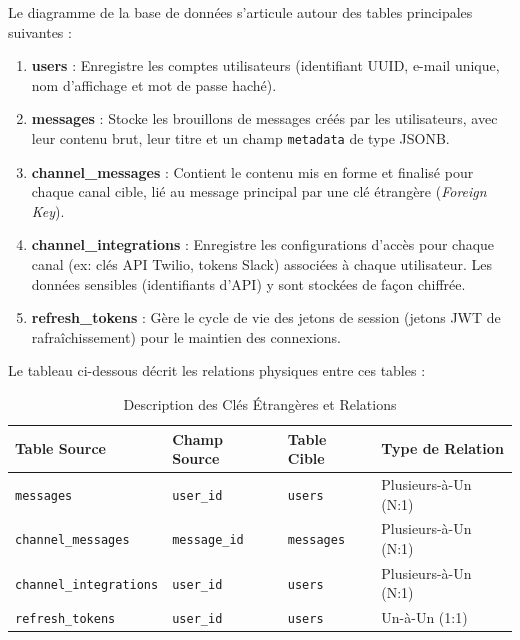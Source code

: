 Le diagramme de la base de données s'articule autour des tables principales suivantes :
\begin{enumerate}
    \item \textbf{users} : Enregistre les comptes utilisateurs (identifiant UUID, e-mail unique, nom d'affichage et mot de passe haché).
    \item \textbf{messages} : Stocke les brouillons de messages créés par les utilisateurs, avec leur contenu brut, leur titre et un champ \texttt{metadata} de type JSONB.
    \item \textbf{channel\_messages} : Contient le contenu mis en forme et finalisé pour chaque canal cible, lié au message principal par une clé étrangère (\textit{Foreign Key}).
    \item \textbf{channel\_integrations} : Enregistre les configurations d'accès pour chaque canal (ex: clés API Twilio, tokens Slack) associées à chaque utilisateur. Les données sensibles (identifiants d'API) y sont stockées de façon chiffrée.
    \item \textbf{refresh\_tokens} : Gère le cycle de vie des jetons de session (jetons JWT de rafraîchissement) pour le maintien des connexions.
\end{enumerate}

Le tableau ci-dessous décrit les relations physiques entre ces tables :

\begin{table}[H]
    \centering
    \caption{Description des Clés Étrangères et Relations}
    \label{tab:database_relations}
    \begin{tabular}{|l|l|l|l|}
        \hline
        \textbf{Table Source} & \textbf{Champ Source} & \textbf{Table Cible} & \textbf{Type de Relation} \\
        \hline
        \texttt{messages} & \texttt{user\_id} & \texttt{users} & Plusieurs-à-Un (N:1) \\
        \hline
        \texttt{channel\_messages} & \texttt{message\_id} & \texttt{messages} & Plusieurs-à-Un (N:1) \\
        \hline
        \texttt{channel\_integrations} & \texttt{user\_id} & \texttt{users} & Plusieurs-à-Un (N:1) \\
        \hline
        \texttt{refresh\_tokens} & \texttt{user\_id} & \texttt{users} & Un-à-Un (1:1) \\
        \hline
    \end{tabular}
\end{table}